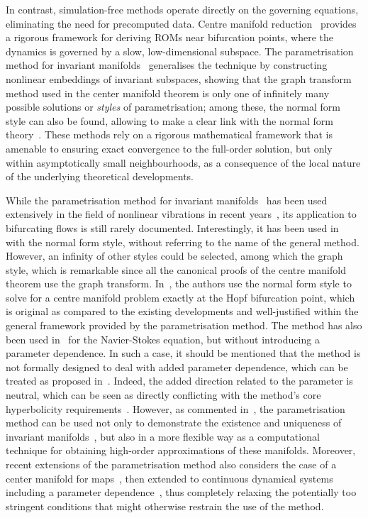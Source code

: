 \documentclass[%
reprint,
superscriptaddress,
 amsmath,amssymb,
 aps,
 pre
]{revtex4-2}
\begin{document}
In contrast, simulation-free methods operate directly on the governing equations, eliminating the need for precomputed data. Centre manifold reduction~\cite{Haken81,gucken83,HaragusIooss} provides a rigorous framework for deriving ROMs near bifurcation points, where the dynamics is governed by a slow, low-dimensional subspace. The parametrisation method for invariant manifolds~\cite{Cabre3,Haro} generalises the technique by constructing nonlinear embeddings of invariant subspaces, showing that the graph transform method used in the center manifold theorem is only one of infinitely many possible solutions or {\it styles} of parametrisation; among these, the normal form style can also be found, allowing to make a clear link with the normal form theory~\cite{Murdock}. These methods rely on a rigorous mathematical framework that is amenable to ensuring exact convergence to the full-order solution, but only within asymptotically small neighbourhoods, as a consequence of the local nature of the underlying theoretical developments.

While the parametrisation method for invariant manifolds~\cite{Haro} has been used extensively in the field of nonlinear vibrations in recent years~\cite{Haller2016,JAIN2021How,ReviewROMGEOMNL,vizza21high,li2021periodic,opreni22high,vizza2023superharm,Martin:rotation,Frangi:electromech,Pinho:shells}, its application to bifurcating flows is still rarely documented. Interestingly, it has been used in~\cite{Carini2015} with the normal form style, without referring to the name of the general method. However, an infinity of other styles could be selected, among which the graph style, which is remarkable since all the canonical proofs of the centre manifold theorem use the graph transform. In~\cite{Carini2015}, the authors use the normal form style to solve for a centre manifold problem exactly at the Hopf bifurcation point, which is original as compared to the existing developments and well-justified within the general framework provided by the parametrisation method. The method has also been used in~\cite{Buza:NS} for the Navier-Stokes equation, but without introducing a parameter dependence. In such a case, it should be mentioned that the method is not formally designed to deal with added parameter dependence, which can be treated as proposed in~\cite{vdb:centerMORE,MingwuLi2024,Stabile:follow}. Indeed, the added direction related to the parameter is neutral, which can be seen as directly conflicting with the method's core hyperbolicity requirements~\cite{Cabre1}. However, as commented in~\cite{Haro}, the parametrisation method can be used not only to demonstrate the existence and uniqueness of invariant manifolds~\cite{Cabre1,cabre2}, but also in a more flexible way as a computational technique for obtaining high-order approximations of these manifolds. Moreover, recent extensions of the parametrisation method also considers the case of a center manifold for maps~\cite{vdb:center2020}, then extended to continuous dynamical systems including a parameter dependence~\cite{vdb:centerMORE}, thus completely relaxing the potentially too stringent conditions that might otherwise restrain the use of the method.
\end{document}
